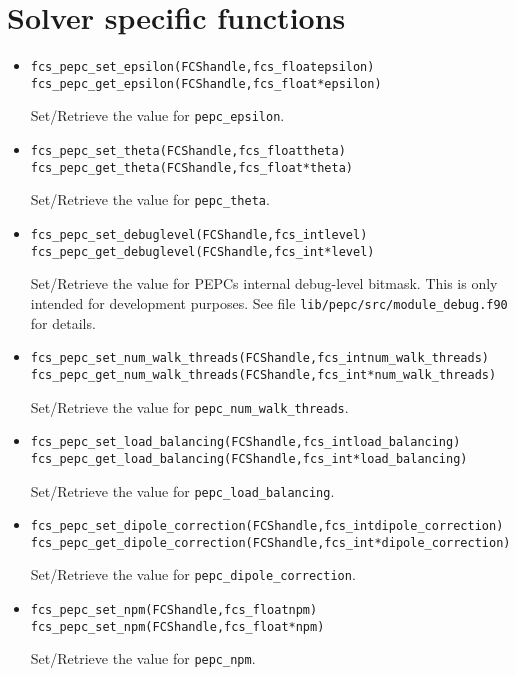 \section*{Solver specific functions}

\begin{itemize}

\item
  \begin{alltt}
    fcs_pepc_set_epsilon(FCS handle, fcs_float epsilon)
    fcs_pepc_get_epsilon(FCS handle, fcs_float* epsilon)
  \end{alltt}
  Set/Retrieve the value for \texttt{pepc\_epsilon}.

\item
  \begin{alltt}
    fcs_pepc_set_theta(FCS handle, fcs_float theta)
    fcs_pepc_get_theta(FCS handle, fcs_float* theta)
  \end{alltt}
  Set/Retrieve the value for \texttt{pepc\_theta}.

\item
  \begin{alltt}
    fcs_pepc_set_debuglevel(FCS handle, fcs_int level)
    fcs_pepc_get_debuglevel(FCS handle, fcs_int* level)
  \end{alltt}
  Set/Retrieve the value for PEPCs internal debug-level bitmask.
  This is only intended for development purposes. 
  See file \texttt{lib/pepc/src/module\_debug.f90} for details.

\item
  \begin{alltt}
    fcs_pepc_set_num_walk_threads(FCS handle, fcs_int num_walk_threads)
    fcs_pepc_get_num_walk_threads(FCS handle, fcs_int* num_walk_threads)
  \end{alltt}
  Set/Retrieve the value for \texttt{pepc\_num\_walk\_threads}.

\item
  \begin{alltt}
    fcs_pepc_set_load_balancing(FCS handle, fcs_int load_balancing)
    fcs_pepc_get_load_balancing(FCS handle, fcs_int* load_balancing)
  \end{alltt}
  Set/Retrieve the value for \texttt{pepc\_load\_balancing}.

\item
  \begin{alltt}
    fcs_pepc_set_dipole_correction(FCS handle, fcs_int dipole_correction)
    fcs_pepc_get_dipole_correction(FCS handle, fcs_int* dipole_correction)
  \end{alltt}
  Set/Retrieve the value for \texttt{pepc\_dipole\_correction}.

\item
  \begin{alltt}
    fcs_pepc_set_npm(FCS handle, fcs_float npm)
    fcs_pepc_set_npm(FCS handle, fcs_float* npm)
  \end{alltt}
  Set/Retrieve the value for \texttt{pepc\_npm}.
  
\end{itemize}


